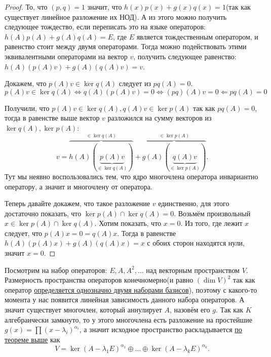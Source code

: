\begin{proof}
    То, что $(p,q) = 1$ значит, что 
    $h(x)p(x) + g(x)q(x) = 1$(так как существует линейное разложение их НОД).
    А из этого можно получить следующее тождество, если переписать это на языке операторов:
    $h(A)p(A) + g(A) q(A) = E$, где $E$ является тождественным оператором, и равенство
    стоит между двумя операторами.
    Тогда можно подействовать этими эквивалентными операторами на вектор $v$, получить
    следующее равенство: $h(A)(p(A)v) + g(A)(q(A)v) = v$.

    Докажем, что $p(A)v\in \ker q(A)$ следует из $pq(A) = 0$.
    \[
        p(A)v\in \ker q(A) \Leftrightarrow q(A)(p(A)v) = 0 \Leftrightarrow (pq)(A)v = 0 \Leftarrow pq(A)=0
    \] 
    
    Получили, что $p(A)v\in \ker q(A), q(A)v\in \ker p(A)$ так как $pq(A)=0$,
    тогда в равенстве выше вектор $v$ разложился на сумму векторов из $\ker q(A), \ker p(A)$:
    \[
        v = 
        \overbrace{h(A)(\underbrace{p(A)v}_{\in \ker q(A)})}^{\in \ker q(A)} + 
        \overbrace{g(A)(\underbrace{q(A)v}_{\in \ker p(A)})}^{\in \ker p(A)}
    .\]
    Тут мы неявно
    воспользовались тем, что ядро многочлена оператора инвариантно оператору, а
    значит и многочлену от оператора.

    Теперь давайте докажем, что такое разложение $v$ единственно, для этого достаточно
    показать, что $\ker p(A) \cap \ker q(A) = 0$. Возьмём произвольный
    $x\in \ker p(A)\cap \ker q(A)$. Хотим показать, что $x = 0$.
    Из того, где лежит  $x$ следует, что $p(A)x = 0 = q(A)x$.
    Тогда в равенстве $h(A)(p(A)x) + g(A)(q(A)x) = x$ с обоих сторон находятся нули, 
    значит $x = 0$.
\end{proof}
\begin{follow}
    Посмотрим на набор операторов: $E, A, A^2, \dots$ над векторным пространством $V$.
    Размерность пространства операторов конечномерно(и равно $(\dim V)^2$ так как
    оператор \hyperref[thm:Линейное отображение определяется действием на базисных векторах]
    {определяется однозначно двумя наборами базисов}), поэтому
    с какого-то момента у нас появится линейная зависимость данного набора операторов.
    А значит существует многочлен, который аннулирует $A$, назовём его $g$.
    Так как $K$ алгебраически замкнуто, то у этого многочлена есть разложение на простейшие
    $g(x) = \prod (x - \lambda_i)^{\alpha_i}$, а значит исходное пространство раскладывается 
    \hyperref[thm:О аннулирующем операторе]{по теореме выше} как 
    \[
        V = \ker (A - \lambda_1 E)^{\alpha_1} \oplus \dots \oplus \ker (A - \lambda_k E)^{\alpha_k}
    .\]
\end{follow}
